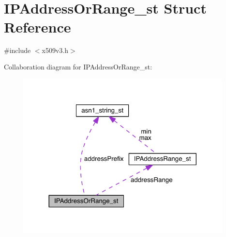 \hypertarget{struct_i_p_address_or_range__st}{}\section{I\+P\+Address\+Or\+Range\+\_\+st Struct Reference}
\label{struct_i_p_address_or_range__st}


{\ttfamily \#include $<$x509v3.\+h$>$}



Collaboration diagram for I\+P\+Address\+Or\+Range\+\_\+st\+:\nopagebreak
\begin{figure}[H]
\begin{center}
\leavevmode
\includegraphics[width=308pt]{struct_i_p_address_or_range__st__coll__graph}
\end{center}
\end{figure}
